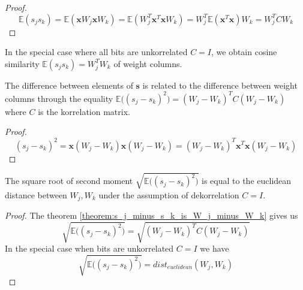 \documentclass[oneside,english,logo]{amuthesis}
\begin{document}
\begin{proof}
\[
\mathbb{E}(s_j s_k) =  \mathbb{E}(\boldsymbol{x} W_j \boldsymbol{x} W_k)=  \mathbb{E}(W_j^T \boldsymbol{x}^T  \boldsymbol{x} W_k) = W_j^T \mathbb{E}(\boldsymbol{x}^T  \boldsymbol{x}) W_k = W_j^T C W_k 
\]
\end{proof}
\begin{corollary}
In the special case where all bits are unkorrelated $C=I$, we obtain cosine similarity $\mathbb{E}(s_j s_k)=W_j^TW_k$ of weight columns.
\end{corollary}
\begin{theorem}
	\label{theorem:s_j_minus_s_k_is_W_j_minus_W_k}
The difference between elements of $\boldsymbol{s}$ is related to the difference between weight columns through the equality $\mathbb{E}\big((s_j - s_k)^2\big) = (W_j - W_k)^T C (W_j - W_k)$ where $C$ is the korrelation matrix.
\end{theorem}
\begin{proof}
	\[
	(s_j - s_k)^2 = \boldsymbol{x} (W_j - W_k) \boldsymbol{x} (W_j - W_k) = (W_j - W_k)^T \boldsymbol{x}^T \boldsymbol{x} (W_j - W_k) 
	\]
\end{proof}
\begin{corollary}
The square root of second moment $\sqrt{\mathbb{E}\big((s_j - s_k)^2\big)}$ is equal to the euclidean distance between $W_j,W_k$ under the assumption of dekorrelation $C=I$.
\end{corollary}
\begin{proof}
The theorem \ref{theorem:s_j_minus_s_k_is_W_j_minus_W_k} gives us
\[
\sqrt{\mathbb{E}\big((s_j - s_k)^2\big)} = \sqrt{(W_j - W_k)^T C (W_j - W_k) }
\]
In the special case when bits are unkorrelated $C=I$ we have
\[
\sqrt{\mathbb{E}\big((s_j - s_k)^2\big)} = dist_{euclidean}(W_j,W_k)
\]
\end{proof}
\end{document}

